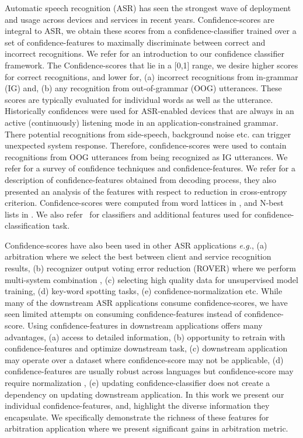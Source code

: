 Automatic speech recognition (ASR) has seen the strongest wave of deployment and usage across devices and services in recent years. Confidence-scores are integral to ASR, we obtain these scores from a confidence-classifier trained over a set of confidence-features to maximally discriminate between correct and incorrect recognitions. We refer \cite{Posen1} for an introduction to our confidence classifier framework. The Confidence-scores that lie in a [0,1] range, we desire higher scores for correct recognitions, and lower for, (a) incorrect recognitions from in-grammar (IG) and, (b) any recognition from out-of-grammar (OOG) utterances. These scores are typically evaluated for individual words as well as the utterance. Historically confidences were used for ASR-enabled devices that are always in an active (continuously) listening mode in an application-constrained grammar. There potential recognitions from side-speech, background noise etc. can trigger unexpected system response. Therefore, confidence-scores were used to contain recognitions from OOG utterances from being recognized as IG utterances. We refer \cite{CMsurvey_Jiang_SpeechCommunication06, Blatz04confidenceestimation,Rose_UV_1995,Mathan_Rejection_1991,Sukkar_UV_1996} for a survey of confidence techniques and confidence-features. We refer \cite{Chase_wordand} for a description of confidence-features obtained from decoding process, they also presented an analysis of the features with respect to reduction in cross-entropy criterion. Confidence-scores were computed from word lattices in \cite{WordLattice_Kemp_Eurospeech97}, and N-best lists in \cite{rueber1997obtaining}. We also refer~\cite{MaximumEntropyConfidence_White_ICASSP07, NBest_Wessel_Eurospeech99, Wessel01ney,Weintraub97} for classifiers and additional features used for confidence-classification task.

Confidence-scores have also been used in other ASR applications \emph{e.g.}, (a) arbitration where we select the best between client and service recognition results, (b) recognizer output voting error reduction (ROVER) where we perform multi-system combination \cite{hillard2007rover,NistRover}, (c) selecting high quality data for unsupervised model training, (d) key-word spotting tasks, (e) confidence-normalization \cite{kumar2014normalization} etc. While many of the downstream ASR applications consume confidence-scores, we have seen limited attempts on consuming confidence-features instead of confidence-score. Using confidence-features in downstream applications offers many advantages, (a) access to detailed information, (b) opportunity to retrain with confidence-features and optimize downstream task, (c) downstream application may operate over a dataset where confidence-score may not be applicable, (d) confidence-features are usually robust across languages but confidence-score may require normalization \cite{kumar2014normalization}, (e) updating confidence-classifier does not create a dependency on updating downstream application. In this work we present our individual confidence-features, and, highlight the diverse information they encapsulate. We specifically demonstrate the richness of these features for arbitration application where we present significant gains in arbitration metric. 

